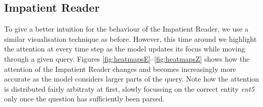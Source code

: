 \subsection{Impatient Reader}

To give a better intuition for the behaviour of the Impatient Reader, we use a
similar visualisation technique as before. However, this time around we
highlight the attention at every time step as the model updates its focus while
moving through a given query. Figures \ref{fig:heatmapsE}--\ref{fig:heatmapsZ} shows how the attention
of the Impatient Reader changes and becomes increasingly more accurate as the
model considers larger parts of the query.
Note how the attention is distributed
fairly arbitraty at first, slowly focussing on the correct entity
\textit{ent5} only once the question has sufficiently been parsed.

